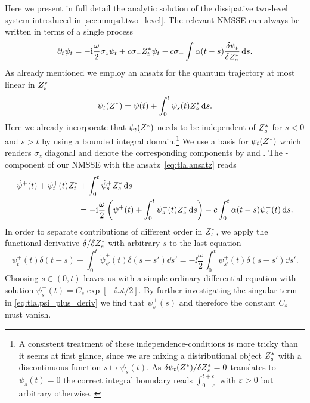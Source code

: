Here we present in full detail the analytic solution of the dissipative two-level system introduced in \autoref{sec:nmqsd.two_level}.
The relevant NMSSE can always be written in terms of a single process
\begin{equation}
  \partial_t \psi_t = -\mathrm{i}\frac{\omega}{2}\sigma_z\psi_t + c \sigma_- {Z}^*_t \psi_t - c\sigma_+ \int \alpha(t - s) \frac{\delta\psi_t}{\delta {Z}^*_s} \, \mathrm{d} s.
  \label{eq:tla.nmsse_twolevel}
\end{equation}
As already mentioned we employ an ansatz for the quantum trajectory at most linear in ${Z}^*_s$
\begin{equation}
  \psi_t({Z}^*) = \psi(t) + \int_0^t \psi_s(t) {Z}^*_s \, \mathrm{d} s.
  \label{eq:tla.ansatz}
\end{equation}
Here we already incorporate that $\psi_t({Z}^*)$ needs to be independent of ${Z}^*_s$ for $s < 0$ and $s>t$ by using a bounded integral domain.\footnote{
  A consistent treatment of these independence-conditions is more tricky than it seems at first glance, since we are mixing a distributional object ${Z}^*_s$ with a discontinuous function $s \mapsto \psi_s(t)$.
  As $\delta \psi_t({Z}^*) / \delta {Z}^*_s = 0$ translates to $\psi_s(t) = 0$ the correct integral boundary reads $\int_{0-\varepsilon}^{t+\varepsilon}$ with $\varepsilon > 0$ but arbitrary otherwise.
  \label{fn:tla.boundaries}
}
We use a basis for $\psi_t({Z}^*)$ which renders $\sigma_z$ diagonal and denote the corresponding components by \quotes{+} and \quotes{-}.
The \quotes{+}-component of our NMSSE with the ansatz~\ref{eq:tla.ansatz} reads
\begin{align}
  \dot\psi^+(t) + \psi^+_t(t){Z}^*_t &+ \int_0^t \dot\psi^+_s{Z}^*_s \, \mathrm{d} s \nonumber\\
  &= -\mathrm{i} \frac{\omega}{2} \left( \psi^+(t) + \int_0^t \psi^+_s(t){Z}^*_s \, \mathrm{d} s \right) - c \int_0^t \alpha(t-s) \psi^-_s(t) \, \mathrm{d} s.
  \label{eq:tla.psi_plus}
\end{align}
In order to separate contributions of different order in ${Z}^*_s$, we apply the functional derivative $\delta/\delta{Z}^*_s$ with arbitrary $s$ to the last equation
\begin{equation}
  \psi^+_t(t) \delta(t - s) + \int_0^t \dot\psi^+_{s'}(t) \delta(s - s') \dd s' = -\ii \frac{\omega}{2} \int_0^t \psi^+_{s'}(t) \delta(s - s') \dd s'.
  \label{eq:tla.psi_plus_deriv}
\end{equation}
Choosing $s \in (0, t)$ leaves us with a simple ordinary differential equation with solution $\psi^+_s(t) = C_s \exp[- \ii \omega t / 2]$.
By further investigating the singular term in \autoref{eq:tla.psi_plus_deriv} we find that $\psi^+_s(s)$ and therefore the constant $C_s$ must vanish.
